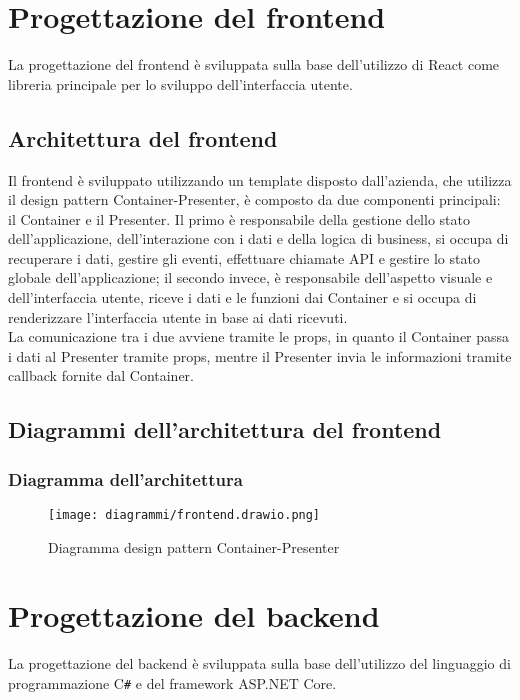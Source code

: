 \section{Progettazione del frontend}
La progettazione del frontend è sviluppata sulla base dell'utilizzo di React come libreria principale per lo sviluppo dell'interfaccia utente.

\subsection{Architettura del frontend}
Il frontend è sviluppato utilizzando un template disposto dall'azienda, che utilizza il design pattern Container-Presenter, è composto da due componenti principali: il Container e il Presenter.
Il primo è responsabile della gestione dello stato dell'applicazione, dell'interazione con i dati e della logica di business, si occupa di recuperare i dati, gestire gli eventi, effettuare chiamate API e gestire lo stato globale dell'applicazione; il secondo invece, è responsabile dell'aspetto visuale e dell'interfaccia utente, riceve i dati e le funzioni dai Container e si occupa di renderizzare l'interfaccia utente in base ai dati ricevuti.\\
La comunicazione tra i due avviene tramite le props, in quanto il Container passa i dati al Presenter tramite props, mentre il Presenter invia le informazioni tramite callback fornite dal Container.\\

\subsection{Diagrammi dell'architettura del frontend}
\subsubsection{Diagramma dell'architettura}
\begin{figure}[!h] 
    \centering 
    \texttt{[image: diagrammi/frontend.drawio.png]} 
    \caption{Diagramma design pattern Container-Presenter}
\end{figure}
\clearpage
\section{Progettazione del backend}
La progettazione del backend è sviluppata sulla base dell'utilizzo del linguaggio di programmazione C\texttt{\#} e del framework ASP.NET Core.\\

